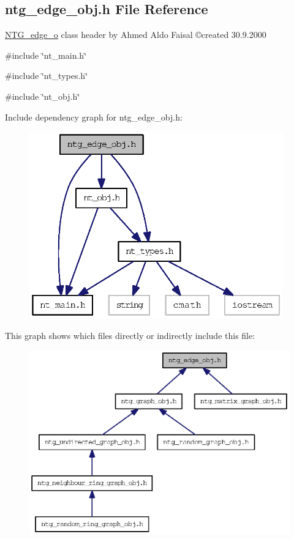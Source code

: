 \subsection{ntg\_\-edge\_\-obj.h File Reference}
\label{ntg__edge__obj_8h}



\begin{DoxyItemize}
\item \hyperlink{class_n_t_g__edge__o}{NTG\_\-edge\_\-o} class header by Ahmed Aldo Faisal \copyright created 30.9.2000 
\end{DoxyItemize} 


{\ttfamily \#include \char`\"{}nt\_\-main.h\char`\"{}}\par
{\ttfamily \#include \char`\"{}nt\_\-types.h\char`\"{}}\par
{\ttfamily \#include \char`\"{}nt\_\-obj.h\char`\"{}}\par
Include dependency graph for ntg\_\-edge\_\-obj.h:
\nopagebreak
\begin{figure}[H]
\begin{center}
\leavevmode
\includegraphics[width=310pt]{ntg__edge__obj_8h__incl}
\end{center}
\end{figure}
This graph shows which files directly or indirectly include this file:
\nopagebreak
\begin{figure}[H]
\begin{center}
\leavevmode
\includegraphics[width=400pt]{ntg__edge__obj_8h__dep__incl}
\end{center}
\end{figure}
